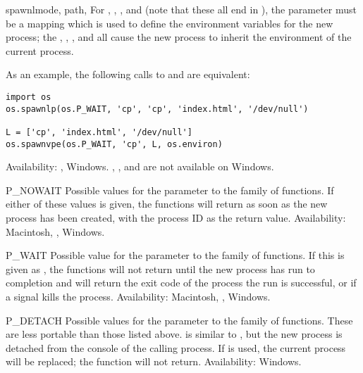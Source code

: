 \begin{funcdesc}{spawnl}{mode, path, \moreargs}
For , , ,
and  (note that these all end in ),
the  parameter must be a mapping which is used to define the
environment variables for the new process; the ,
, , and 
all cause the new process to inherit the environment of the current
process.

As an example, the following calls to  and
 are equivalent:

\begin{verbatim}
import os
os.spawnlp(os.P_WAIT, 'cp', 'cp', 'index.html', '/dev/null')

L = ['cp', 'index.html', '/dev/null']
os.spawnvpe(os.P_WAIT, 'cp', L, os.environ)
\end{verbatim}

Availability: \UNIX, Windows.  ,
,  and 
are not available on Windows.
\end{funcdesc}

\begin{datadesc}{P_NOWAIT}
Possible values for the  parameter to the 
family of functions.  If either of these values is given, the
 functions will return as soon as the new process
has been created, with the process ID as the return value.
Availability: Macintosh, \UNIX, Windows.
\end{datadesc}

\begin{datadesc}{P_WAIT}
Possible value for the  parameter to the 
family of functions.  If this is given as , the
 functions will not return until the new process
has run to completion and will return the exit code of the process the
run is successful, or  if a signal kills the
process.
Availability: Macintosh, \UNIX, Windows.
\end{datadesc}

\begin{datadesc}{P_DETACH}
Possible values for the  parameter to the
 family of functions.  These are less portable than
those listed above.
 is similar to , but the new
process is detached from the console of the calling process.
If  is used, the current process will be replaced;
the  function will not return.
Availability: Windows.
\end{datadesc}

